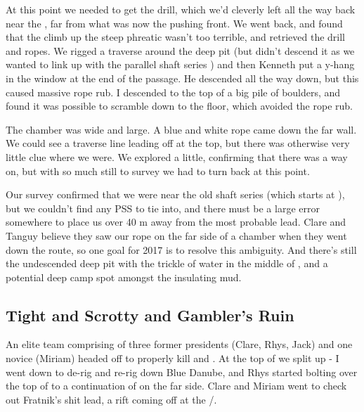 At this point we needed to get the drill, which we’d cleverly left all the way back near the , far from what was now the pushing front. We went back, and found that the climb up the steep phreatic wasn’t too terrible, and retrieved the drill and ropes. We rigged a traverse around the deep pit (but didn’t descend it as we wanted to link up with the parallel shaft series ) and then Kenneth put a y-hang in the window at the end of the passage. He descended all the way down, but this caused massive rope rub. I descended to the top of a big pile of boulders, and found it was possible to scramble down to the floor, which avoided the rope rub.
 
The chamber was wide and large. A blue and white rope came down the far wall. We could see a traverse line leading off at the top, but there was otherwise very little clue where we were. We explored a little, confirming that there was a way on, but with so much still to survey we had to turn back at this point.
 
Our survey confirmed that we were near the old shaft series (which starts at ), but we couldn’t find any PSS to tie into, and there must be a large error somewhere to place us over 40 m away from the most probable lead. Clare and Tanguy believe they saw our rope on the far side of a chamber when they went down the  route, so one goal for 2017 is to resolve this ambiguity. And there’s still the undescended deep pit with the trickle of water in the middle of , and a potential deep camp spot amongst the insulating mud.
 
 

\subsection{Tight and Scrotty and Gambler’s Ruin}

An elite team comprising of three former presidents (Clare, Rhys, Jack) and one novice (Miriam) headed off to properly kill  and . At the top of  we split up - I went down  to de-rig and re-rig down Blue Danube, and Rhys started bolting over the top of  to a continuation of  on the far side. Clare and Miriam went to check out Fratnik’s shit lead, a rift coming off at the /.

